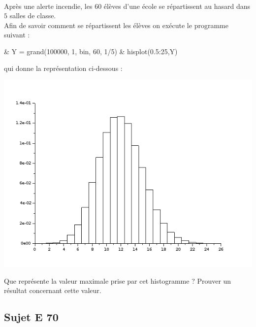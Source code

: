 \documentclass[11pt]{article}%
\begin{document}
\begin{exerciceSP}~\\
  Après une alerte incendie, les $60$ élèves d'une école se
  répartissent au hasard dans $5$ salles de classe.\\
  Afin de savoir comment se répartissent les élèves on exécute le
  programme \Scilab{} suivant :

  \begin{scilab}
    & Y = grand(100000, 1, \ttq{}bin\ttq{}, 60, 1/5) \nl %
    & hisplot(0.5:25,Y) \nl %
  \end{scilab}
  qui donne la représentation ci-dessous :

  \begin{center}
    \includegraphics[scale=0.5]{Figures/Exo_incendie.png}
  \end{center}
  Que représente la valeur maximale prise par cet histogramme ?
  Prouver un résultat concernant cette valeur.
\end{exerciceSP}


\newpage

\subsection*{Sujet E 70}

\end{document}
